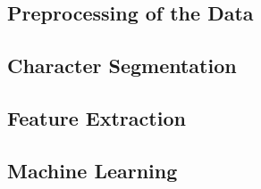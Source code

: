 
\subsection{Preprocessing of the Data}
\label{ss:methods:preprocessing}


\subsection{Character Segmentation}
\label{ss:methods:characterSegmentation}


\subsection{Feature Extraction}
\label{ss:methods:featureExtraction}


\subsection{Machine Learning}
\label{ss:methods:machineLearing}
